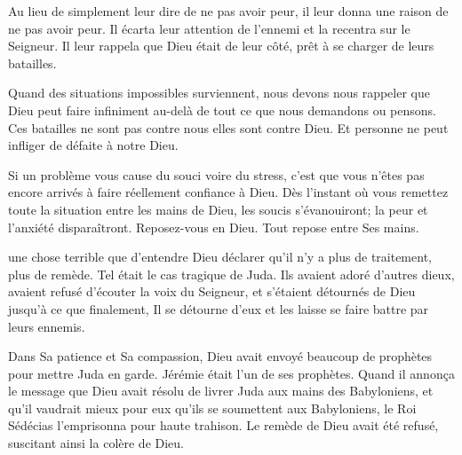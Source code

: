 Au lieu de simplement leur dire de ne pas avoir peur,
 il leur donna une raison de ne pas avoir peur.
 Il écarta leur attention de l'ennemi et la recentra sur le Seigneur.
 Il leur rappela que Dieu était de leur côté,
 prêt à se charger de leurs batailles.


Quand des situations impossibles surviennent,
 nous devons nous rappeler que Dieu peut faire infiniment au-delà
 de tout ce que nous demandons ou pensons.
 Ces batailles ne sont pas contre nous \ocadr{}elles sont contre Dieu.
 Et personne ne peut infliger de défaite à notre Dieu.

Si un problème vous cause du souci voire du stress,
 c'est que vous n'êtes pas encore arrivés à faire réellement
 confiance à Dieu.
 Dès l'instant où vous remettez toute la situation entre les mains de Dieu,
 les soucis s'évanouiront\thinspace; la peur et l'anxiété disparaîtront.
 Reposez-vous en Dieu. Tout repose entre Ses mains. 

\dvrule







 une chose terrible que d'entendre Dieu déclarer
 qu'il n'y a plus de traitement, plus de remède.
 Tel était le cas tragique de Juda.
 Ils avaient adoré d'autres dieux, avaient refusé d'écouter
 la voix du Seigneur, et s'étaient détournés de Dieu
 \ocadr{}jusqu'à ce que finalement, Il se détourne d'eux
 et les laisse se faire battre par leurs ennemis. 


Dans Sa patience et Sa compassion, Dieu avait envoyé beaucoup de prophètes
 pour mettre Juda en garde.
 Jérémie était l'un de ses prophètes.
 Quand il annonça le message que Dieu avait résolu de livrer Juda
 aux mains des Babyloniens,
 et qu'il vaudrait mieux pour eux qu'ils se soumettent aux Babyloniens,
 le Roi Sédécias l'emprisonna pour haute trahison.
 Le remède de Dieu avait été refusé, suscitant ainsi la colère de Dieu.

